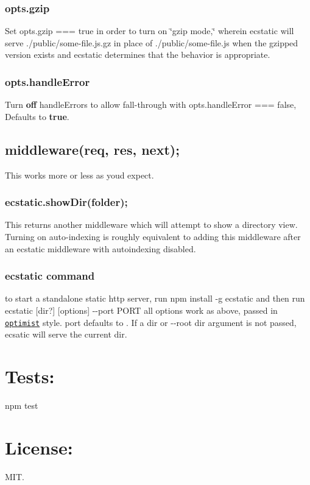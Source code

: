 \subsubsection*{{\ttfamily opts.\+gzip}}

Set {\ttfamily opts.\+gzip === true} in order to turn on \char`\"{}gzip mode,\char`\"{} wherein ecstatic will serve {\ttfamily ./public/some-\/file.js.\+gz} in place of {\ttfamily ./public/some-\/file.js} when the gzipped version exists and ecstatic determines that the behavior is appropriate.

\subsubsection*{{\ttfamily opts.\+handle\+Error}}

Turn {\bfseries off} handle\+Errors to allow fall-\/through with {\ttfamily opts.\+handle\+Error === false}, Defaults to {\bfseries true}.

\subsection*{middleware(req, res, next);}

This works more or less as you\textquotesingle{}d expect.

\subsubsection*{ecstatic.\+show\+Dir(folder);}

This returns another middleware which will attempt to show a directory view. Turning on auto-\/indexing is roughly equivalent to adding this middleware after an ecstatic middleware with autoindexing disabled.

\subsubsection*{{\ttfamily ecstatic} command}

to start a standalone static http server, run {\ttfamily npm install -\/g ecstatic} and then run {\ttfamily ecstatic \mbox{[}dir?\mbox{]} \mbox{[}options\mbox{]} -\/-\/port P\+O\+RT} all options work as above, passed in \href{https://github.com/substack/node-optimist}{\tt optimist} style. {\ttfamily port} defaults to {}. If a {\ttfamily dir} or {\ttfamily -\/-\/root dir} argument is not passed, ecsatic will serve the current dir.

\section*{Tests\+:}

\begin{DoxyVerb}npm test
\end{DoxyVerb}


\section*{License\+:}

M\+IT. 